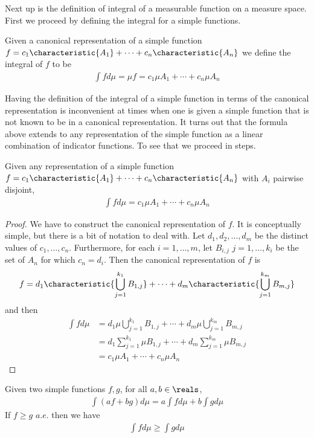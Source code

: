 Next up is the definition of integral of a measurable function on a
measure space.  First we proceed by defining the integral for a simple functions.
\begin{defn}
Given a canonical representation of a simple function $f =
c_1 \characteristic{A_1} + \cdots + c_n \characteristic{A_n}$ we
define the integral of $f$ to be
\begin{align*}
\int f d\mu = \mu f = c_1 \mu A_1 + \cdots + c_n \mu A_n
\end{align*}
\end{defn}
Having the definition of the integral of a simple function in terms of
the canonical representation is inconvenient at times when one is
given a simple function that is not known to be in a canonical
representation.  It turns out that the formula above extends to any
representation of the simple function as a linear combination of
indicator functions.  To see that we proceed in steps.
\begin{lem}Given any representation of a simple function $f =
c_1 \characteristic{A_1} + \cdots + c_n \characteristic{A_n}$ with
$A_i$ pairwise disjoint,
\begin{align*}
\int f d\mu = c_1 \mu A_1 + \cdots + c_n \mu A_n
\end{align*}
\end{lem}
\begin{proof}We have to construct the canonical representation of
  $f$.  It is conceptually simple, but there is a bit of notation to
  deal with.
  Let $d_1, d_2, \dots, d_m$ be the distinct values of $c_1, \dots,
  c_n$.  Furthermore, for each $i=1,\dots,m$, let $B_{i,j}$ 
  $j=1,\dots,k_i$ be the set of $A_n$ for which $c_n = d_i$.  Then the
  canonical representation of $f$ is 
\begin{align*}
f = d_1 \characteristic{\bigcup_{j=1}^{k_1} B_{1,j}} + \cdots + d_m \characteristic{\bigcup_{j=1}^{k_m} B_{m,j}}
\end{align*}
and then 
\begin{align*}
\int f d \mu &= d_1 \mu \bigcup_{j=1}^{k_1} B_{1,j} + \cdots + d_m \mu
\bigcup_{j=1}^{k_m} B_{m,j} \\
&= d_1 \sum_{j=1}^{k_1} \mu B_{1,j} + \cdots + d_m 
\sum_{j=1}^{k_m} \mu B_{m,j} \\
&= c_1 \mu A_1 + \cdots + c_n \mu A_n
\end{align*}
\end{proof}
\begin{lem}\label{LinearityIntegralSimpleFunctions}Given two simple functions $f,g$, for all $a,b \in \reals$,
 \begin{align*}
\int \left (af + bg \right ) d \mu = a \int f d \mu + b \int g d \mu
\end{align*}
If $f \geq g$ $a.e.$ then we have
 \begin{align*}
\int f d \mu \geq \int g d \mu
\end{align*}
\end{lem}
